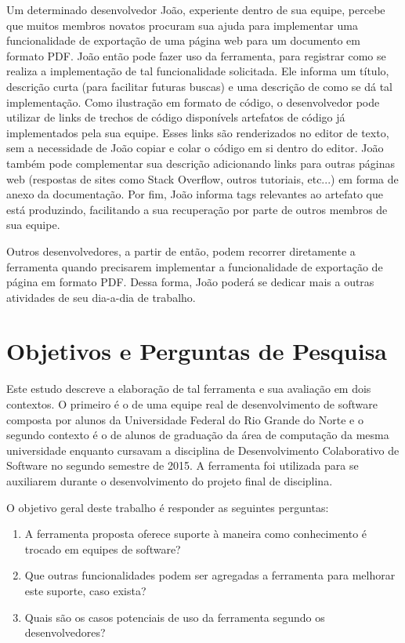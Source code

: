 Um determinado desenvolvedor João, experiente dentro de sua equipe, percebe que muitos membros novatos procuram sua ajuda para implementar uma funcionalidade de exportação de uma página web para um documento em formato PDF. João então pode fazer uso da ferramenta, para registrar como se realiza a implementação de tal funcionalidade solicitada. Ele informa um título, descrição curta (para facilitar futuras buscas) e uma descrição de como se dá tal implementação. Como ilustração em formato de código, o desenvolvedor pode utilizar de links de trechos de código disponívels artefatos de código já implementados pela sua equipe. Esses links são renderizados no editor de texto, sem a necessidade de João copiar e colar o código em si dentro do editor. João também pode complementar sua descrição adicionando links para outras páginas web (respostas de sites como Stack Overflow, outros tutoriais, etc...) em forma de anexo da documentação. Por fim, João informa tags relevantes ao artefato que está produzindo, facilitando a sua recuperação por parte de outros membros de sua equipe.

Outros desenvolvedores, a partir de então, podem recorrer diretamente a ferramenta quando precisarem implementar a funcionalidade de exportação de página em formato PDF. Dessa forma, João poderá se dedicar mais a outras atividades de seu dia-a-dia de trabalho.

\section{Objetivos e Perguntas de Pesquisa}

Este estudo descreve a elaboração de tal ferramenta e sua avaliação em dois contextos. O primeiro é o de uma equipe real de desenvolvimento de software composta por alunos da Universidade Federal do Rio Grande do Norte e o segundo contexto é o de alunos de graduação da área de computação da mesma universidade enquanto cursavam a disciplina de Desenvolvimento Colaborativo de Software no segundo semestre de 2015. A ferramenta foi utilizada para se auxiliarem durante o desenvolvimento do projeto final de disciplina.

O objetivo geral deste trabalho é responder as seguintes perguntas:

\begin{enumerate}
  \item A ferramenta proposta oferece suporte à maneira como conhecimento é trocado em equipes de software?
  \item Que outras funcionalidades podem ser agregadas a ferramenta para melhorar este suporte, caso exista?
  \item Quais são os casos potenciais de uso da ferramenta segundo os desenvolvedores?
\end{enumerate}

